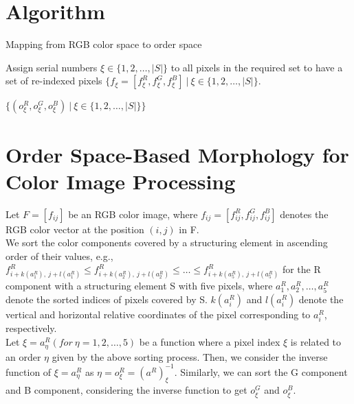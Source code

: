 \section*{Algorithm}
\begin{algorithm}[H]
\caption{Mapping from RGB color space to order space}

Assign serial numbers $\xi \in \{1,2,\ldots, |S|\}$ to all pixels in the required set to have a set of re-indexed pixels  $\{f_{\xi} = [f_{\xi}^{R}, f_{\xi}^{G}, f_{\xi}^{B}]\ |\ \xi \in \{1,2,\ldots, |S|\}$.

\Return $\{(o_{\xi}^{R}, o_{\xi}^{G}, o_{\xi}^{B})\ | \ \xi \in \{1,2,\ldots, |S|\}\}$
\end{algorithm}

\section*{Order Space-Based Morphology for Color Image Processing}

Let $F = [f_{ ij }] $ be an RGB color image, where $f_{ ij } = [f_{ ij }^{R}, f_{ ij }^{G}, f_{ ij }^{B}] $ denotes the RGB color vector at the position $(i,j)$ in F. \\

We sort the color components covered by a structuring element in ascending order of their values, e.g., 
$f^{R}_{i+k(a_{1}^{R}),\ j+l(a_{1}^{R})  } \leq 
f^{R}_{i+k(a_{2}^{R}),\ j+l(a_{2}^{R})  } \leq \ldots \leq
f^{R}_{i+k(a_{5}^{R}),\ j+l(a_{5}^{R})  }$
for the R component with a structuring element S with five pixels, where $a_{ 1 }^{R},a_{ 2 }^{R},\ldots,a_{ 5 }^{R}$
 denote the sorted indices of pixels covered by S. $k(a_{i}^{R})$
 and $l(a_{i}^{R})$
 denote the vertical and horizontal relative coordinates of the pixel corresponding to $a_{i}^{R}$, respectively.\\

 Let $\xi=a_{\eta}^{R} (for\ \eta=1,2,\ldots,5)$
 be a function where a pixel index $\xi$ is related to an order $\eta$
 given by the above sorting process. 
 Then, we consider the inverse function of $\xi=a_{\eta}^{R}$
 as $\eta=o_{\xi}^{R} = (a^{R})_{\xi}^{-1}$. Similarly, we can sort the G component and B component, considering the inverse function to get $o_{\xi}^{G}$ and $o_{\xi}^{B}$.\\
 
